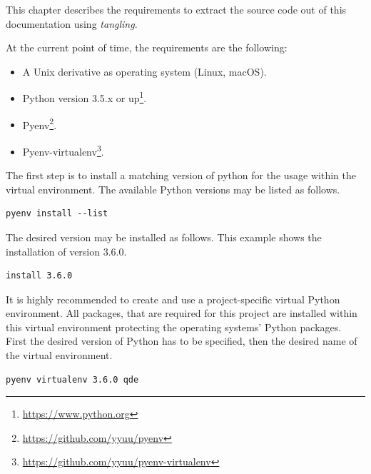 \documentclass[10pt, openright, notitlepage]{scrreprt}
\begin{document}
This chapter describes the requirements to extract the source code out of this
documentation using \emph{tangling}.

At the current point of time, the requirements are the following:

\begin{itemize}
\item A Unix derivative as operating system (Linux, macOS).
\item Python version 3.5.x or up\footnote{\url{https://www.python.org}}.
\item Pyenv\footnote{\url{https://github.com/yyuu/pyenv}}.
\item Pyenv-virtualenv\footnote{\url{https://github.com/yyuu/pyenv-virtualenv}}.
\end{itemize}

The first step is to install a matching version of python for the usage within
the virtual environment. The available Python versions may be listed as follows.

\begin{listing}[H]
\begin{verbatim}
pyenv install --list
\end{verbatim}
\caption{\label{fig:impl-pyenv-list}
Listing all available versions of Python for use in Pyenv.}
\end{listing}

The desired version may be installed as follows. This example shows the
installation of version 3.6.0.

\begin{listing}[H]
\begin{verbatim}
install 3.6.0
\end{verbatim}
\caption{\label{fig:impl-pyenv-install}
Installation of Python version 3.6.0 for the usage with Pyenv.}
\end{listing}

It is highly recommended to create and use a project-specific virtual Python
environment. All packages, that are required for this project are installed
within this virtual environment protecting the operating systems' Python
packages.
First the desired version of Python has to be specified, then the desired name
of the virtual environment.

\begin{listing}[H]
\begin{verbatim}
pyenv virtualenv 3.6.0 qde
\end{verbatim}
\caption{\label{fig:impl-pyenv-venv}
Creation of the virtual environment \texttt{qde} for Python using version 3.6.0 of Python.}
\end{listing}
\end{document}
